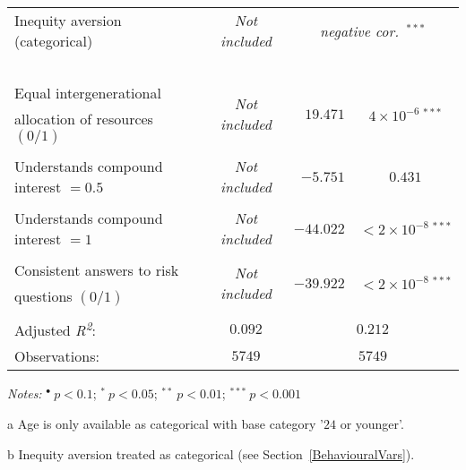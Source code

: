 \documentclass[a4paper,12pt]{article}
\begin{document}
{\begin{threeparttable}
\begin{small}
\begin{tabular}{lrcrc}
        \\       
  \vspace{-0.2cm}Inequity aversion (categorical)\tnote{b}&\multicolumn{2}{c}{\textit{Not included}}&\multicolumn{2}{c}{\textit{negative cor.~}$^{***}$}\\\
      \\
 Equal intergenerational&\multicolumn{2}{c}{\multirow{2}{*}{\textit{Not included}}}&\multirow{2}{*}{$19.471$}&\multirow{2}{*}{$4\times10^{-6}~^{***}$}\\
\vspace{-0.2cm}\hspace{0.6cm}allocation of resources $(0/1)$&\\
 \\  
\vspace{-0.2cm}Understands compound interest $=0.5$&\multicolumn{2}{c}{\textit{Not included}}&$-5.751$&$0.431$ \\
  \\
\vspace{-0.2cm}Understands compound interest $=1$&\multicolumn{2}{c}{\textit{Not included}}&$-44.022$&$<2\times10^{-8}~^{***}$\\
  \\  
  Consistent answers to risk&\multicolumn{2}{c}{\multirow{2}{*}{\textit{Not included}}}&\multirow{2}{*}{$-39.922$}&\multirow{2}{*}{$<2\times10^{-8}~^{***}$}\\
\hspace{0.6cm}questions $(0/1)$&& &
  \\
\hline  \vspace{-0.2cm}
  \\
Adjusted \textit{R\textsuperscript2}:&\multicolumn{2}{c}{$0.092$}&\multicolumn{2}{c}{$0.212$}\\
 Observations:&\multicolumn{2}{c}{$5749$}&\multicolumn{2}{c}{$5749$}\\
\hline
\end{tabular} 
\end{small}
 \begin{tablenotes}
  \begin{footnotesize}
   \item \textit{Notes:} \hspace{0.2cm}$^{\bullet}~p<0.1$; $^{*}~p<0.05$; $^{**}~p<0.01$; $^{***}~p<0.001$
  \begin{adjustwidth}{1cm}{}\item[a]Age is only available as categorical with  base category '$24$ or younger'.
\item[b]Inequity aversion treated as categorical (see Section~\ref{BehaviouralVars}).
     \end{adjustwidth}
\singlespacing
  \end{footnotesize}
\end{tablenotes}
  \end{threeparttable} 
\par}
\end{document}
